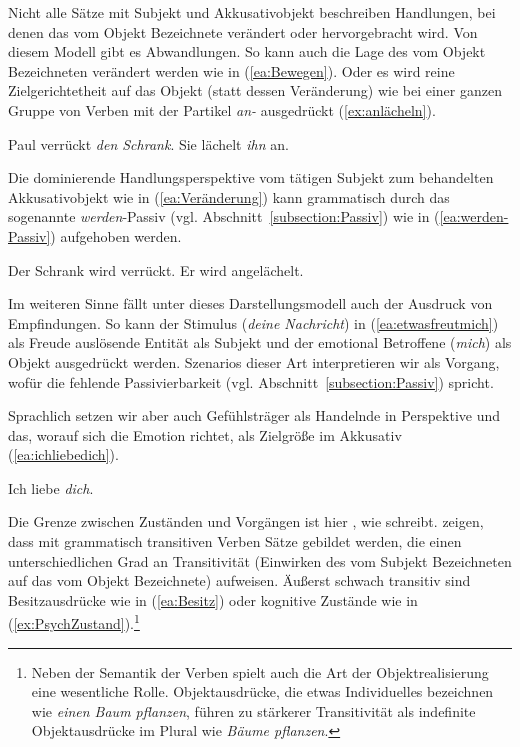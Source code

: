 Nicht alle Sätze mit Subjekt und Akkusativobjekt beschreiben Handlungen, bei denen das vom Objekt Bezeichnete verändert oder hervorgebracht wird. Von diesem Modell gibt es Abwandlungen. So kann auch die Lage des vom Objekt Bezeichneten verändert werden wie in (\ref{ea:Bewegen}). Oder es wird reine Zielgerichtetheit auf das Objekt (statt dessen Veränderung) wie bei einer ganzen Gruppe von Verben mit der Partikel \textit{an-} ausgedrückt (\ref{ex:anlächeln}). 

\largerpage
\ea \label{ea:Veränderung}
\ea \label{ea:Bewegen} Paul verrückt \textit{den Schrank}.
\ex \label{ex:anlächeln} Sie lächelt \textit{ihn} an. 
\z 
\z 

Die dominierende Handlungsperspektive vom tätigen Subjekt zum behandelten Akkusativobjekt wie in (\ref{ea:Veränderung}) kann grammatisch durch das sogenannte \textit{werden}-Passiv (vgl. Abschnitt~\ref{subsection:Passiv}) wie in (\ref{ea:werden-Passiv}) aufgehoben werden.

\ea \label{ea:werden-Passiv}
\ea \label{ea:verrücktwerden} Der Schrank wird verrückt.
\ex \label{ex:angelächeltwerden} Er wird angelächelt.
\z 
\z 


Im weiteren Sinne fällt unter dieses Darstellungsmodell auch der Ausdruck von Empfindungen. So kann der Stimulus (\textit{deine Nachricht}) in (\ref{ea:etwasfreutmich}) als Freude auslösende Entität als Subjekt und der emotional Betroffene (\textit{mich}) als Objekt ausgedrückt werden. Szenarios dieser Art interpretieren wir als Vorgang, wofür die fehlende Passivierbarkeit (vgl. Abschnitt~\ref{subsection:Passiv}) spricht.

\ea \label{ea:PSYCH}
\label{ea:etwasfreutmich}
\label{ex:*gefreutPassiv}
\z 
\z 

Sprachlich setzen wir aber auch Gefühlsträger als Handelnde in Perspektive und das, worauf sich die Emotion richtet, als Zielgröße im Akkusativ (\ref{ea:ichliebedich}).

\ea \label{ea:ichliebedich} Ich liebe \textit{dich}.
\z 

Die Grenze zwischen Zuständen und Vorgängen ist hier , wie \citet[144]{Welke2019} schreibt. \citet[252--254]{HopperThompson1980} zeigen, dass mit grammatisch transitiven Verben Sätze gebildet werden, die einen unterschiedlichen Grad an Transitivität (Einwirken des vom Subjekt Bezeichneten auf das vom Objekt Bezeichnete) aufweisen. Äußerst schwach transitiv sind Besitzausdrücke wie in (\ref{ea:Besitz}) oder kognitive Zustände wie in (\ref{ex:PsychZustand}).\footnote{Neben der Semantik der Verben spielt auch die Art der Objektrealisierung eine wesentliche Rolle. Objektausdrücke, die etwas Individuelles bezeichnen wie \textit{einen Baum pflanzen}, führen zu stärkerer Transitivität als indefinite Objektausdrücke im Plural wie \textit{Bäume pflanzen}.}

